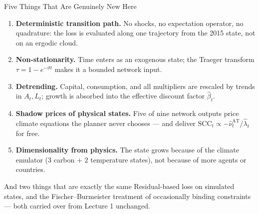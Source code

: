 \documentclass[aspectratio=169,11pt]{beamer}
\begin{document}
\begin{frame}{Five Things That Are Genuinely New Here}
\small
\begin{enumerate}
    \item \textbf{Deterministic transition path.} No shocks, no expectation operator, no quadrature: the loss is evaluated along one trajectory from the 2015 state, not on an ergodic cloud.
    \item \textbf{Non-stationarity.} Time enters as an exogenous state; the Traeger transform $\tau = 1-e^{-\vartheta t}$ makes it a bounded network input.
    \item \textbf{Detrending.} Capital, consumption, and all multipliers are rescaled by trends in $A_t, L_t$; growth is absorbed into the effective discount factor $\hat{\beta}_t$.
    \item \textbf{Shadow prices of physical states.} Five of nine network outputs price climate equations the planner never chooses --- and deliver $\mathrm{SCC}_t \propto -\hat{\nu}^{\text{AT}}_t/\hat{\lambda}_t$ for free.
    \item \textbf{Dimensionality from physics.} The state grows because of the climate emulator (3 carbon $+$ 2 temperature states), not because of more agents or countries.
\end{enumerate}

\vspace{0.3em}
\begin{block}{And two things that are exactly the same}
Residual-based loss on simulated states, and the Fischer--Burmeister treatment of occasionally binding constraints --- both carried over from Lecture 1 unchanged.
\end{block}
\end{frame}
\end{document}
